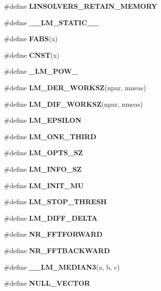 \begin{CompactItemize}
\item 
\#define \textbf{LINSOLVERS\_\-RETAIN\_\-MEMORY}\label{group__nr_g24a049e550264f1529e47347e9753f7e}

\item 
\#define \textbf{\_\-\_\-LM\_\-STATIC\_\-\_\-}\label{group__nr_gf3381d1cf7cf6839730587497fb744b7}

\item 
\#define \textbf{FABS}(x)\label{group__nr_g9b649f4d878e64a80b4cd2cad45f43b3}

\item 
\#define \textbf{CNST}(x)\label{group__nr_g8097f2f4c007bf8d2ea1e7558b2248e0}

\item 
\#define \textbf{\_\-LM\_\-POW\_\-}\label{group__nr_gb28c2198a94b5c5508ab04b28e31aed2}

\item 
\#define {\bf LM\_\-DER\_\-WORKSZ}(npar, nmeas)
\item 
\#define {\bf LM\_\-DIF\_\-WORKSZ}(npar, nmeas)
\item 
\#define \textbf{LM\_\-EPSILON}\label{group__nr_g4bd7ce4e1f4cc6be913fc6a383bce112}

\item 
\#define \textbf{LM\_\-ONE\_\-THIRD}\label{group__nr_g307e270c028a33b97c90f66245f81452}

\item 
\#define \textbf{LM\_\-OPTS\_\-SZ}\label{group__nr_ge3ee35a37fd4d8532ac769d5bd372a53}

\item 
\#define \textbf{LM\_\-INFO\_\-SZ}\label{group__nr_g20fee96f47f09233385fb107510b45da}

\item 
\#define \textbf{LM\_\-INIT\_\-MU}\label{group__nr_g6664bcbe28414c3df4b36063a6823d0c}

\item 
\#define \textbf{LM\_\-STOP\_\-THRESH}\label{group__nr_g344f3598e6156022e8c5175b060d9201}

\item 
\#define \textbf{LM\_\-DIFF\_\-DELTA}\label{group__nr_g0560e7d9a262a0c72f156639096a261d}

\item 
\#define {\bf NR\_\-FFTFORWARD}
\item 
\#define {\bf NR\_\-FFTBACKWARD}
\item 
\#define {\bf \_\-\_\-LM\_\-MEDIAN3}(a, b, c)
\item 
\#define \textbf{NULL\_\-VECTOR}\label{group__nr_g9839236a6f8b2f71c017c7ad3564c12d}


\end{CompactItemize}
